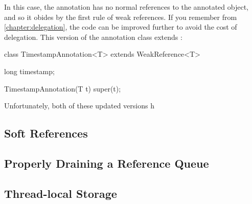 In this case, the annotation has no normal references to the annotated object,
and so it obides by the first rule of weak references. If you remember from
\autoref{chapter:delegation}, the code can be improved further to avoid the cost
of delegation. This version of the annotation class extends
:

\begin{shortlisting}
class TimestampAnnotation<T> extends WeakReference<T> {
	long timestamp;
	
	TimestampAnnotation(T t) {
		super(t);
	}
}
\end{shortlisting}

Unfortunately, both of these updated versions h

\subsection{Soft References}

\subsection{Properly Draining a Reference Queue}

\subsection{Thread-local Storage}


